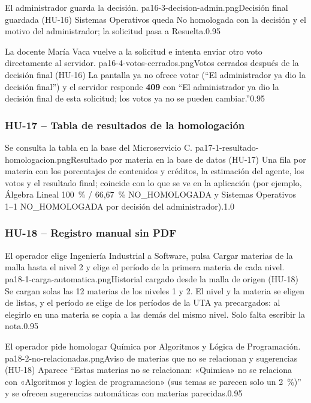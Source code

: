 {El administrador guarda la decisión.}
{pa16-3-decision-admin.png}{Decisión final guardada (HU-16)}
{Sistemas Operativos queda No homologada con la decisión y el motivo del administrador; la solicitud pasa a Resuelta.}{0.95}

{La docente María Vaca vuelve a la solicitud e intenta enviar otro voto directamente al servidor.}
{pa16-4-votos-cerrados.png}{Votos cerrados después de la decisión final (HU-16)}
{La pantalla ya no ofrece votar (``El administrador ya dio la decisión final'') y el servidor responde \textbf{409} con
``El administrador ya dio la decisión final de esta solicitud; los votos ya no se pueden cambiar.''}{0.95}

\subsubsection{HU-17 -- Tabla de resultados de la homologación}

{Se consulta la tabla en la base del Microservicio C.}
{pa17-1-resultado-homologacion.png}{Resultado por materia en la base de datos (HU-17)}
{Una fila por materia con los porcentajes de contenidos y créditos, la estimación del agente, los votos y el resultado
final; coincide con lo que se ve en la aplicación (por ejemplo, Álgebra Lineal 100~\% / 66,67~\% NO\_HOMOLOGADA y
Sistemas Operativos 1--1 NO\_HOMOLOGADA por decisión del administrador).}{1.0}

\subsubsection{HU-18 -- Registro manual sin PDF}

{El operador elige Ingeniería Industrial a Software, pulsa Cargar materias de la malla hasta el nivel 2 y elige el período de la primera materia de cada nivel.}
{pa18-1-carga-automatica.png}{Historial cargado desde la malla de origen (HU-18)}
{Se cargan solas las 12 materias de los niveles 1 y 2. El nivel y la materia se eligen de listas, y el período se elige de los períodos de la UTA ya precargados: al elegirlo en una materia se copia a las demás del mismo nivel. Solo falta escribir la nota.}{0.95}

{El operador pide homologar Química por Algoritmos y Lógica de Programación.}
{pa18-2-no-relacionadas.png}{Aviso de materias que no se relacionan y sugerencias (HU-18)}
{Aparece ``Estas materias no se relacionan: «Quimica» no se relaciona con «Algoritmos y logica de programacion» (sus
temas se parecen solo un 2~\%)'' y se ofrecen sugerencias automáticas con materias parecidas.}{0.95}

